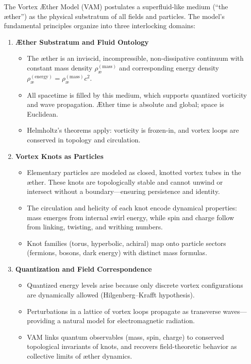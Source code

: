 \begin{tcolorbox}[axiomstyle]
    The Vortex Æther Model (VAM) postulates a superfluid-like medium (“the æther”) as the physical substratum of all fields and particles. The model’s fundamental principles organize into three interlocking domains:

    \begin{enumerate}[label=\textbf{A\arabic*.}, leftmargin=*]
        \item \textbf{Æther Substratum and Fluid Ontology}
        \begin{itemize}
            \item The æther is an inviscid, incompressible, non-dissipative continuum with constant mass density $\rho_{\text{\ae}}^{(\mathrm{mass})}$ and corresponding energy density $\rho_{\text{\ae}}^{(\mathrm{energy})} = \rho_{\text{\ae}}^{(\mathrm{mass})} c^2$.
            \item All spacetime is filled by this medium, which supports quantized vorticity and wave propagation. Æther time is absolute and global; space is Euclidean.
            \item Helmholtz’s theorems apply: vorticity is frozen-in, and vortex loops are conserved in topology and circulation.
        \end{itemize}

        \item \textbf{Vortex Knots as Particles}
        \begin{itemize}
            \item Elementary particles are modeled as closed, knotted vortex tubes in the æther. These knots are topologically stable and cannot unwind or intersect without a boundary—ensuring persistence and identity.
            \item The circulation and helicity of each knot encode dynamical properties: mass emerges from internal swirl energy, while spin and charge follow from linking, twisting, and writhing numbers.
            \item Knot families (torus, hyperbolic, achiral) map onto particle sectors (fermions, bosons, dark energy) with distinct mass formulas.
        \end{itemize}

        \item \textbf{Quantization and Field Correspondence}
        \begin{itemize}
            \item Quantized energy levels arise because only discrete vortex configurations are dynamically allowed (Hilgenberg–Krafft hypothesis).
            \item Perturbations in a lattice of vortex loops propagate as transverse waves—providing a natural model for electromagnetic radiation.
            \item VAM links quantum observables (mass, spin, charge) to conserved topological invariants of knots, and recovers field-theoretic behavior as collective limits of æther dynamics.
        \end{itemize}
    \end{enumerate}
\end{tcolorbox}



